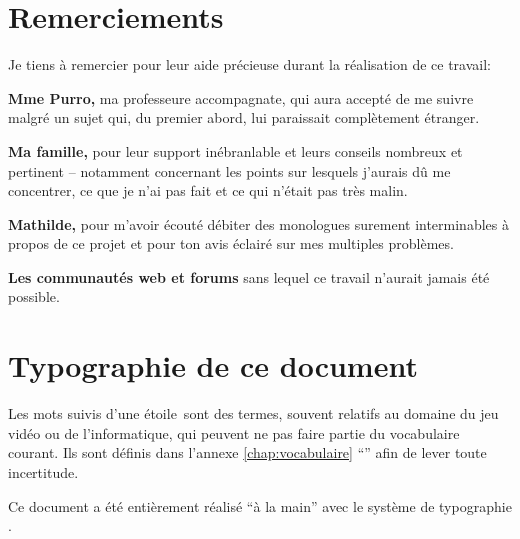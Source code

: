 

\null
\vspace{.1\textheight}
\section*{Remerciements}
Je tiens à remercier pour leur aide précieuse durant la réalisation de ce travail:

\textbf{Mme Purro, }ma professeure accompagnate, qui aura accepté de me suivre malgré un sujet qui, du premier abord, lui paraissait complètement étranger.

\textbf{Ma famille, }pour leur support inébranlable et leurs conseils nombreux et pertinent -- notamment concernant les points sur lesquels j'aurais dû me concentrer, ce que je n'ai pas fait et ce qui n'était pas très malin.

\textbf{Mathilde, }pour m'avoir écouté débiter des monologues surement interminables à propos de ce projet et pour ton avis éclairé sur mes multiples problèmes.

\textbf{Les communautés web et forums} sans lequel ce travail n'aurait jamais été possible.




\newpage
\null
\vspace{.1\textheight}
\section*{Typographie de ce document}
Les mots suivis d'une étoile\ sont des termes, souvent relatifs au domaine du jeu vidéo ou de l'informatique, qui peuvent ne pas faire partie du vocabulaire courant. Ils sont définis dans l'annexe \ref{chap:vocabulaire} \enquote{} afin de lever toute incertitude.

\vspace*{\baselineskip}

\vspace*{-\baselineskip}

\vspace*{-\baselineskip}

\vfill
\begin{center}
	Ce document a été entièrement réalisé \enquote{à la main} avec le système de typographie \XeLaTeX.
\end{center}

	